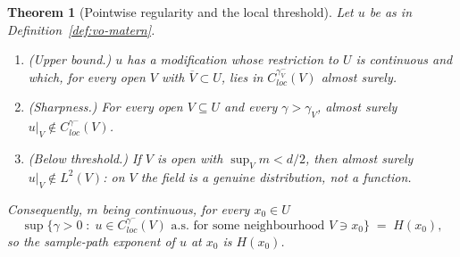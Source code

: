 \documentclass[pdflatex,sn-mathphys,Numbered]{sn-jnl}
\theoremstyle{thmstyleone}%
\newtheorem{theorem}{Theorem}[section]%
\theoremstyle{thmstyletwo}%
\theoremstyle{thmstylethree}%
\begin{document}
\begin{theorem}[Pointwise regularity and the local threshold]\label{thm:pointwise}
Let $u$ be as in Definition~\ref{def:vo-matern}.
\begin{enumerate}
\item[(i)] \textup{(Upper bound.)} $u$ has a modification whose restriction to
$U$ is continuous and which, for every open $V$ with $\overline V \subset U$,
lies in $C^{\gamma_V^-}_{loc}(V)$ almost surely.
\item[(ii)] \textup{(Sharpness.)} For every open $V \subseteq U$ and every
$\gamma > \gamma_V$, almost surely $u|_V \notin C^{\gamma^-}_{loc}(V)$.
\item[(iii)] \textup{(Below threshold.)} If $V$ is open with
$\sup_V m < d/2$, then almost surely $u|_V \notin L^2(V)$: on $V$ the field is
a genuine distribution, not a function.
\end{enumerate}
Consequently, $m$ being continuous, for every $x_0 \in U$
\[
    \sup\bigl\{\gamma>0 \;:\; u \in C^{\gamma^-}_{loc}(V) \text{ a.s.\ for some
    neighbourhood } V \ni x_0 \bigr\} \;=\; H(x_0) ,
\]
so the sample-path exponent of $u$ at $x_0$ is $H(x_0)$.
\end{theorem}
\end{document}
